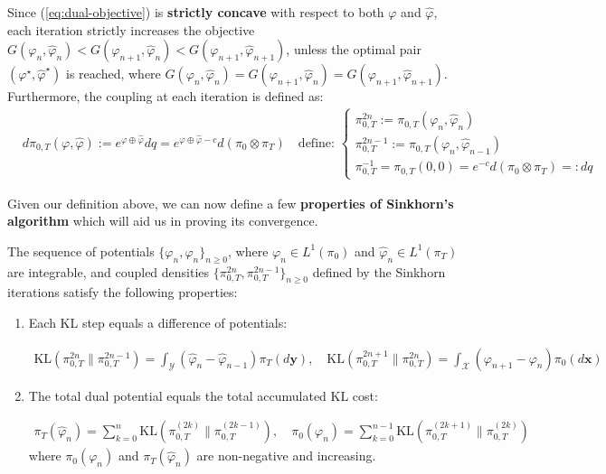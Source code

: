 \documentclass{article}
\begin{document}
Since (\ref{eq:dual-objective}) is \textbf{strictly concave} with respect to both $\varphi$ and $\hat{\varphi}$, each iteration strictly increases the objective $G(\varphi_n, \hat{\varphi}_n)< G(\varphi_{n+1}, \hat{\varphi}_n)< G(\varphi_{n+1}, \hat{\varphi}_{n+1})$, unless the optimal pair $(\varphi^\star, \hat{\varphi}^\star)$ is reached, where $G(\varphi_n, \hat{\varphi}_n)=G(\varphi_{n+1}, \hat{\varphi}_n)=G(\varphi_{n+1}, \hat{\varphi}_{n+1})$. Furthermore, the coupling at each iteration is defined as:
\begin{align}
    &d\pi_{0,T}(\varphi, \hat{\varphi}):=e^{\varphi\oplus\hat{\varphi}}dq=e^{\varphi\oplus\hat{\varphi}-c}d(\pi_0\otimes \pi_T)\quad \text{define: } \begin{cases}
        \pi^{2n}_{0,T}:=\pi_{0,T}(\varphi_{n}, \hat{\varphi}_n)\\
        \pi_{0,T}^{2n-1}:=\pi_{0,T}(\varphi_{n}, \hat{\varphi}_{n-1})\\
        \pi^{-1}_{0,T}=\pi_{0,T}(0,0)=e^{-c}d(\pi_0\otimes \pi_T)=:dq
    \end{cases}\label{eq:sinkhorn-density2}
\end{align}

Given our definition above, we can now define a few \textbf{properties of Sinkhorn's algorithm} which will aid us in proving its convergence. 

\begin{lemma}\label{lemma:sinkhorn-properties}
    The sequence of potentials $\{\varphi_n, \hat{\varphi}_n\}_{n\geq 0}$, where $\varphi_n\in L^1(\pi_0)$ and $\hat{\varphi}_n\in L^1(\pi_T)$ are integrable, and coupled densities $\{\pi_{0,T}^{2n}, \pi^{2n-1}_{0,T}\}_{n\geq 0}$ defined by the Sinkhorn iterations satisfy the following properties:
    \begin{enumerate}
        \item [(i)] Each KL step equals a difference of potentials:
        \begin{small}
        \begin{align}
            \text{KL}\left(\pi_{0,T}^{2n}\|\pi_{0,T}^{2n-1}\right)=\int_{\mathcal{Y}}(\hat{\varphi}_n-\hat{\varphi}_{n-1})\pi_T(d\boldsymbol{y}), \quad \text{KL}\left(\pi_{0,T}^{2n+1}\|\pi_{0,T}^{2n}\right)=\int_{\mathcal{X}}(\varphi_{n+1}-\varphi_n)\pi_0(d\boldsymbol{x})\nonumber
        \end{align}
        \end{small}
        \item[(ii)] The total dual potential equals the total accumulated KL cost:
        \begin{small}
        \begin{align}
            \pi_T(\hat{\varphi}_n)=\sum_{k=0}^{n}\text{KL}\left(\pi_{0,T}^{(2k)}\|\pi_{0,T}^{(2k-1)}\right), \quad \pi_0(\varphi_n)=\sum_{k=0}^{n-1}\text{KL}\left(\pi_{0,T}^{(2k+1)}\|\pi_{0,T}^{(2k)}\right) \nonumber
        \end{align}
        where $\pi_0(\varphi_n)$ and $\pi_T(\hat{\varphi}_n)$ are non-negative and increasing.
        \end{small}
    \end{enumerate}
\end{lemma}
\end{document}
